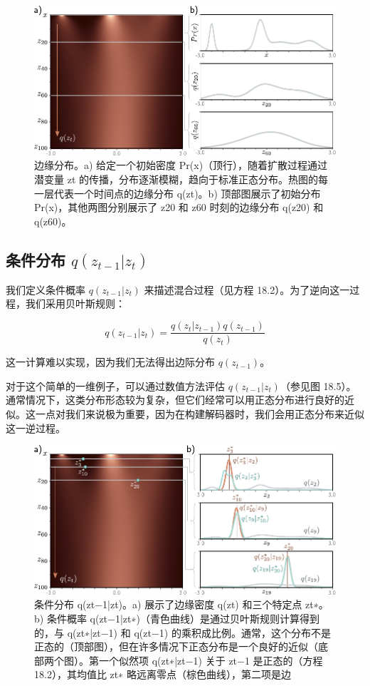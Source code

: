 \documentclass[lang=cn,newtx,10pt,scheme=chinese]{elegantbook}
\begin{document}
\begin{figure}[ht!]
\centering
\includegraphics[width=0.7\linewidth]{PDFFigures/UDLChap18PDF/DiffusionDensity.pdf}
\caption{边缘分布。a) 给定一个初始密度 Pr(x)（顶行），随着扩散过程通过潜变量 zt 的传播，分布逐渐模糊，趋向于标准正态分布。热图的每一层代表一个时间点的边缘分布 q(zt)。b) 顶部图展示了初始分布 Pr(x)，其他两图分别展示了 z20 和 z60 时刻的边缘分布 q(z20) 和 q(z60)。}
\end{figure}


\subsection{条件分布 \texorpdfstring{\(q(z_{t-1}|z_t)\)}{} }
我们定义条件概率 \(q(z_{t-1}|z_t)\) 来描述混合过程（见方程 18.2）。为了逆向这一过程，我们采用贝叶斯规则：

\begin{equation}
q(z_{t-1}|z_t) = \frac{q(z_t|z_{t-1})q(z_{t-1})}{q(z_t)} 
\end{equation}

这一计算难以实现，因为我们无法得出边际分布 \(q(z_{t-1})\)。

对于这个简单的一维例子，可以通过数值方法评估 \(q(z_{t-1}|z_t)\)（参见图 18.5）。通常情况下，这类分布形态较为复杂，但它们经常可以用正态分布进行良好的近似。这一点对我们来说极为重要，因为在构建解码器时，我们会用正态分布来近似这一逆过程。

\begin{figure}[ht!]
\centering
\includegraphics[width=0.7\linewidth]{PDFFigures/UDLChap18PDF/DiffusionReverse.pdf}
\caption{条件分布 q(zt−1|zt)。a) 展示了边缘密度 q(zt) 和三个特定点 zt∗。b) 条件概率 q(zt−1|zt∗)（青色曲线）是通过贝叶斯规则计算得到的，与 q(zt∗|zt−1) 和 q(zt−1) 的乘积成比例。通常，这个分布不是正态的（顶部图），但在许多情况下正态分布是一个良好的近似（底部两个图）。第一个似然项 q(zt∗|zt−1) 关于 zt−1 是正态的（方程 18.2），其均值比 zt∗ 略远离零点（棕色曲线），第二项是边}
\end{figure}
\end{document}
